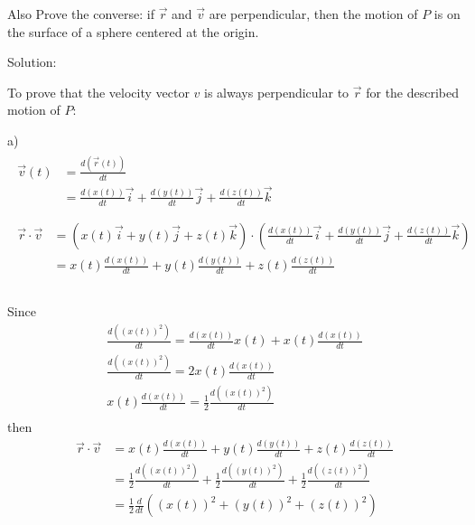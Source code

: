 \documentclass{article}
\begin{document}
Also Prove the converse: if $\vec{r}$ and $\vec{v}$ are perpendicular, then the 
motion of $P$ is on the surface of a sphere centered at the origin.

Solution:

To prove that the velocity vector $v$ is always perpendicular to $\vec{r}$ for 
the described motion of $P$:

a)
\begin{gather*}
  \begin{split}
    \vec{v}(t) &= \frac{d(\vec{r}(t))}{dt} \\
               &= \frac{d(x(t))}{dt} \vec{i} + \frac{d(y(t))}{dt} \vec{j} + \frac{d(z(t))}{dt} \vec{k} \\
  \end{split} \\
  \begin{split}
    \vec{r} \cdot \vec{v} &= (x(t) \vec{i} + y(t) \vec{j} + z(t) \vec{k}) \cdot (\frac{d(x(t))}{dt} \vec{i} + \frac{d(y(t))}{dt} \vec{j} + \frac{d(z(t))}{dt} \vec{k}) \\
                          &= x(t) \frac{d(x(t))}{dt} + y(t) \frac{d(y(t))}{dt} + z(t) \frac{d(z(t))}{dt} \\
  \end{split} \\
\end{gather*}

Since 
\begin{gather*}
  \frac{d((x(t))^2)}{dt} = \frac{d(x(t))}{dt} x(t) + x(t) \frac{d(x(t))}{dt} \\
  \frac{d((x(t))^2)}{dt} = 2 x(t) \frac{d(x(t))}{dt} \\
  x(t) \frac{d(x(t))}{dt} = \frac{1}{2} \frac{d((x(t))^2)}{dt} \\
\end{gather*}
then
\begin{equation*}
  \begin{split}
    \vec{r} \cdot \vec{v} &= x(t) \frac{d(x(t))}{dt} + y(t) \frac{d(y(t))}{dt} + z(t) \frac{d(z(t))}{dt} \\
                          &= \frac{1}{2} \frac{d((x(t))^2)}{dt} + \frac{1}{2} \frac{d((y(t))^2)}{dt} + \frac{1}{2} \frac{d((z(t))^2)}{dt} \\
                          &= \frac{1}{2} \frac{d}{dt} ((x(t))^2 + (y(t))^2 + (z(t))^2) \\
  \end{split}
\end{equation*}
\end{document}
